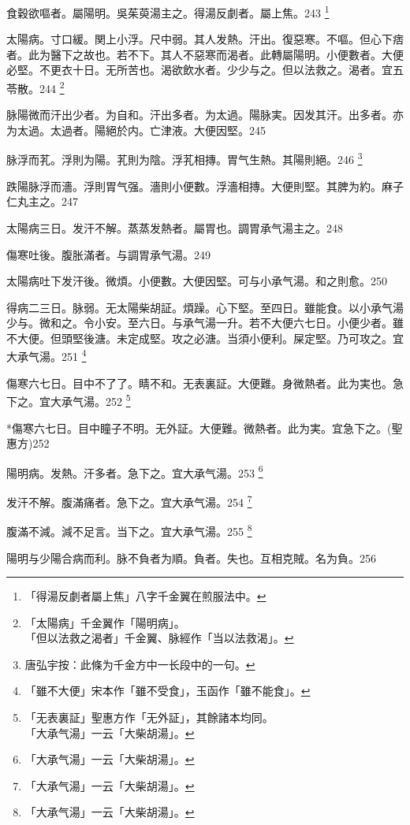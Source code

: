 食穀欲嘔者。屬陽明。{\khaaitp 吳}茱萸湯主之。得湯反劇者。屬上焦。243
	\footnote{「得湯反劇者屬上焦」八字千金翼在煎服法中。}

太陽病。寸{\khaaitp 口}緩。関{\khaaitp 上小}浮。尺{\khaaitp 中}弱。其人发熱。汗出。復惡寒。不嘔。但心下痞者。此为醫下之故也。若不下。其人不惡寒而渴者。此轉屬陽明。小便數者。大便必堅。不更衣十日。无所苦也。{\khaaitp 渴}欲飲水者。少少与之。但以法救之。渴者。宜五苓散。244
	\footnote{「太陽病」千金翼作「陽明病」。\\「但以法救之渴者」千金翼、脉經作「当以法救渴」。}

脉陽微而汗出少者。为自和。汗出多者。为太過。陽脉実。因发其汗。出多者。亦为太過。太過者。陽絕於内。亡津液。大便因堅。245

脉浮而芤。浮則为陽。芤則为陰。浮芤相摶。胃气生熱。其陽則絕。246
	\footnote{唐弘宇按：此條为千金方中一长段中的一句。}

跌陽脉浮而濇。浮則胃气强。濇則小便數。浮濇相摶。大便則堅。其脾为約。麻子仁丸主之。247

太陽病三日。发汗不解。蒸蒸发熱者。屬胃也。{\khaaitp 調胃}承气湯主之。248

傷寒吐後。腹胀滿者。与{\khaaitp 調胃}承气湯。249

太陽病吐下发汗後。微煩。小便數。大便因堅。可与小承气湯。和之則愈。250

得病二三日。脉弱。无太陽柴胡証。煩躁。心下堅。至四日。雖能食。以{\khaaitp 小}承气湯少与。微和之。令小安。至六日。与承气湯一升。若不大便六七日。小便少者。雖不大便。但頭堅後溏。未定成堅。攻之必溏。当須小便利。屎定堅。乃可攻之。宜{\khaaitp 大}承气湯。251
	\footnote{「雖不大便」宋本作「雖不受食」，玉函作「雖不能食」。}

傷寒六七日。目中不了了。睛不和。无表{\khaaitp 裏}証。大便難。身微熱者。此为実也。急下之。宜{\khaaitp 大}承气湯。252
	\footnote{「无表裏証」聖惠方作「无外証」，其餘諸本均同。\\「大承气湯」一云「大柴胡湯」。}

*傷寒六七日。目中瞳子不明。无外証。大便難。微熱者。此为実。宜急下之。(聖惠方)252

陽明病。发熱。汗多者。急下之。宜{\khaaitp 大}承气湯。253
	\footnote{「大承气湯」一云「大柴胡湯」。}

发汗不解。腹滿痛者。急下之。宜{\khaaitp 大}承气湯。254
	\footnote{「大承气湯」一云「大柴胡湯」。}

腹滿不減。減不足言。当下之。宜{\khaaitp 大}承气湯。255
	\footnote{「大承气湯」一云「大柴胡湯」。}

陽明与少陽合病而利。脉不負者为順。負者。失也。互相克賊。名为負。256

